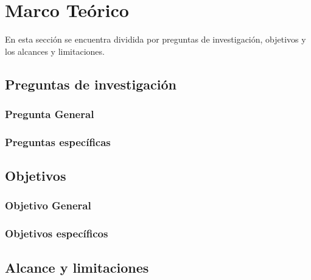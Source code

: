 \chapter{Marco Teórico}
En esta sección se encuentra dividida por preguntas de investigación, objetivos y los alcances y limitaciones.

\section{Preguntas de investigación}
\subsection{Pregunta General}

\subsection{Preguntas específicas}


\section{Objetivos}
\subsection{Objetivo General}

\subsection{Objetivos específicos}


\section{Alcance y limitaciones}